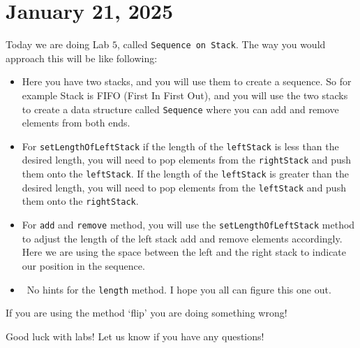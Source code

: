 \documentclass[11pt]{article}
\begin{document}
\section{January 21, 2025}
Today we are doing Lab \(5\), called \texttt{Sequence on Stack}. The way you
would approach this will be like following:
\begin{itemize}
    \item Here you have two stacks, and you will use them to create a sequence. So for
          example Stack is FIFO (First In First Out), and you will use the two stacks to
          create a data structure called \texttt{Sequence} where you can add and remove
          elements from both ends.
    \item For \texttt{setLengthOfLeftStack} if the length of the \texttt{leftStack} is
          less than the desired length, you will need to pop elements from the
          \texttt{rightStack} and push them onto the \texttt{leftStack}. If the length of
          the \texttt{leftStack} is greater than the desired length, you will need to pop
          elements from the \texttt{leftStack} and push them onto the
          \texttt{rightStack}.

    \item For \texttt{add} and \texttt{remove} method, you will use the \texttt{setLengthOfLeftStack} method to adjust the length of the left stack add and remove elements accordingly. Here we are using the space between the left and the right stack to indicate our position in the sequence. 
    \item\ No hints for the \texttt{length} method. I hope you all can figure this one out. 
\end{itemize}

\begin{fact}
    If you are using the method `flip' you are doing something wrong! 
\end{fact}
Good luck with labs! Let us know if you have any questions!
\end{document}
